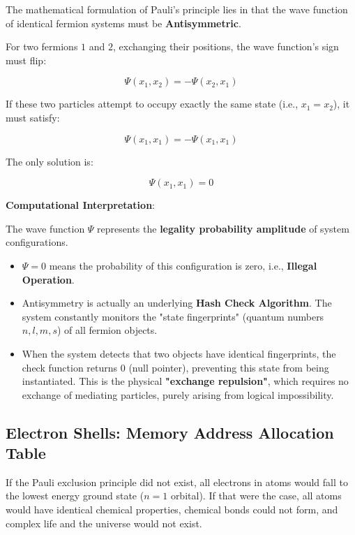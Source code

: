 The mathematical formulation of Pauli's principle lies in that the wave function of identical fermion systems must be \textbf{Antisymmetric}.

For two fermions $1$ and $2$, exchanging their positions, the wave function's sign must flip:

\begin{equation}
\Psi(x_1, x_2) = -\Psi(x_2, x_1)
\end{equation}

If these two particles attempt to occupy exactly the same state (i.e., $x_1 = x_2$), it must satisfy:

\begin{equation}
\Psi(x_1, x_1) = -\Psi(x_1, x_1)
\end{equation}

The only solution is:

\begin{equation}
\Psi(x_1, x_1) = 0
\end{equation}

\textbf{Computational Interpretation}:

The wave function $\Psi$ represents the \textbf{legality probability amplitude} of system configurations.

\begin{itemize}
\item $\Psi = 0$ means the probability of this configuration is zero, i.e., \textbf{Illegal Operation}.

\item Antisymmetry is actually an underlying \textbf{Hash Check Algorithm}. The system constantly monitors the "state fingerprints" (quantum numbers $n, l, m, s$) of all fermion objects.

\item When the system detects that two objects have identical fingerprints, the check function returns $0$ (null pointer), preventing this state from being instantiated. This is the physical \textbf{"exchange repulsion"}, which requires no exchange of mediating particles, purely arising from logical impossibility.
\end{itemize}

\subsection{Electron Shells: Memory Address Allocation Table}

If the Pauli exclusion principle did not exist, all electrons in atoms would fall to the lowest energy ground state ($n=1$ orbital). If that were the case, all atoms would have identical chemical properties, chemical bonds could not form, and complex life and the universe would not exist.

